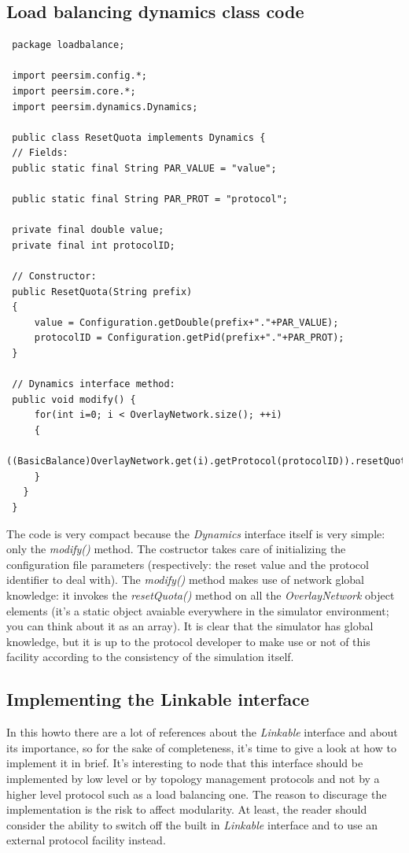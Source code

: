 \documentclass[a4paper,12pt]{article}
\begin{document}
\subsection{Load balancing dynamics class code}

\footnotesize
\begin{verbatim}
 package loadbalance;
 
 import peersim.config.*;
 import peersim.core.*;
 import peersim.dynamics.Dynamics;
 
 public class ResetQuota implements Dynamics {
 // Fields:
 public static final String PAR_VALUE = "value";
 
 public static final String PAR_PROT = "protocol";
 
 private final double value;
 private final int protocolID;
 
 // Constructor:
 public ResetQuota(String prefix)
 {
     value = Configuration.getDouble(prefix+"."+PAR_VALUE);
     protocolID = Configuration.getPid(prefix+"."+PAR_PROT);
 }
 
 // Dynamics interface method:
 public void modify() {
     for(int i=0; i < OverlayNetwork.size(); ++i)
     {
         ((BasicBalance)OverlayNetwork.get(i).getProtocol(protocolID)).resetQuota();
     }
   }
 }
\end{verbatim}
\normalsize

The code is very compact because the \emph{Dynamics} interface itself
is very simple: only the \emph{modify()} method. The costructor takes
care of initializing the configuration file parameters (respectively:
the reset value and the protocol identifier to deal with). The \emph{modify()}
method makes use of network global knowledge: it invokes the \emph{resetQuota()}
method on all the \emph{OverlayNetwork} object elements (it's a static
object avaiable everywhere in the simulator environment; you can think
about it as an array). It is clear that the simulator has global knowledge,
but it is up to the protocol developer to make use or not of this
facility according to the consistency of the simulation itself. 


\subsection{Implementing the Linkable interface}

In this howto there are a lot of references about the \emph{Linkable}
interface and about its importance, so for the sake of completeness,
it's time to give a look at how to implement it in brief. It's interesting
to node that this interface should be implemented by low level or
by topology management protocols and not by a higher level protocol
such as a load balancing one. The reason to discurage the implementation
is the risk to affect modularity. At least, the reader should consider
the ability to switch off the built in \emph{Linkable} interface and
to use an external protocol facility instead.
\end{document}
